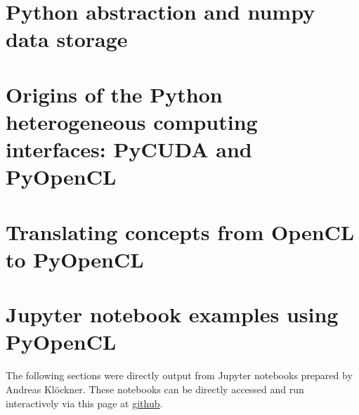 

\section{Python abstraction and numpy data storage}

\section{Origins of the Python heterogeneous computing interfaces: PyCUDA and PyOpenCL}

\section{Translating concepts from OpenCL to PyOpenCL}

\section{Jupyter notebook examples using PyOpenCL}

The following sections were directly output from Jupyter notebooks prepared by Andreas Kl\"{o}ckner. These notebooks can be directly accessed and run interactively via this page at \href{ https://bit.ly/vtgpu19}{github}.

\newpage


\newpage


\newpage


\newpage
